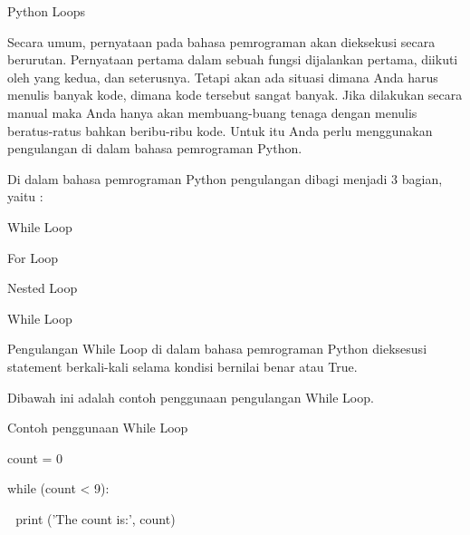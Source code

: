 \sloppy
\begin{center}Python Loops\end{center} \par
\vspace{12pt}
\vspace{12pt}
Secara umum, pernyataan pada bahasa pemrograman akan dieksekusi secara berurutan. Pernyataan pertama dalam sebuah fungsi dijalankan pertama, diikuti oleh yang kedua, dan seterusnya. Tetapi akan ada situasi dimana Anda harus menulis banyak kode, dimana kode tersebut sangat banyak. Jika dilakukan secara manual maka Anda hanya akan membuang-buang tenaga dengan menulis beratus-ratus bahkan beribu-ribu kode. Untuk itu Anda perlu menggunakan pengulangan di dalam bahasa pemrograman Python. \par
\noindent 
\vspace{\baselineskip}
\vspace{\baselineskip}
Di dalam bahasa pemrograman Python pengulangan dibagi menjadi 3 bagian, yaitu : \par
\noindent 
While Loop \par
\noindent 
For Loop \par
\noindent 
Nested Loop \par
\noindent 
\vspace{\baselineskip}
\vspace{\baselineskip}
\vspace{12pt}
\noindent 
While Loop \par
\noindent 
Pengulangan While Loop di dalam bahasa pemrograman Python dieksesusi statement berkali-kali selama kondisi bernilai benar atau True. \par
\noindent 
\vspace{\baselineskip}
\vspace{\baselineskip}
Dibawah ini adalah contoh penggunaan pengulangan While Loop. \par
\noindent 
\vspace{\baselineskip}
\vspace{12pt}
\noindent 
Contoh penggunaan While Loop \par
\noindent 
\vspace{\baselineskip}
\vspace{\baselineskip}
count = 0 \par
\noindent 
\vspace{\baselineskip}
while (count < 9): \par
\noindent 
\vspace{\baselineskip}
 $  $  $  $ print ('The count is:', count) \par
